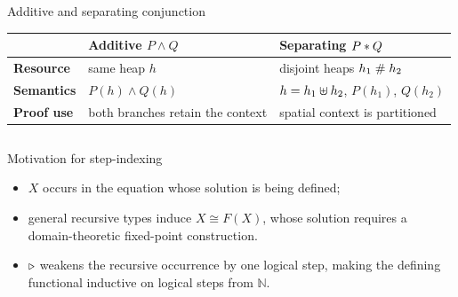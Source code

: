 \documentclass[10pt,aspectratio=169]{beamer}
\begin{document}
\begin{frame}{Additive and separating conjunction}
  \begin{table}
    \centering
    \begin{tabularx}{\textwidth}{>{\bfseries}p{} Y Y}
      \toprule
      & Additive $P\land Q$ & Separating $P\mathbin{*} Q$ \\
      \midrule
      Resource
        & same heap $h$
        & disjoint heaps $h_1\mathrel{\#} h_2$ \\
      Semantics
        & $P(h)\land Q(h)$
        & $h=h_1\mathbin{\uplus} h_2$, $P(h_1)$, $Q(h_2)$ \\
      Proof use
        & both branches retain the context
        & spatial context is partitioned \\
      \bottomrule
    \end{tabularx}
  \end{table}

  \vspace{0.35cm}
  \begin{columns}[T,onlytextwidth]
    \begin{column}{0.49\textwidth}
    \end{column}
    \begin{column}{0.49\textwidth}
    \end{column}
  \end{columns}
\end{frame}

\begin{frame}{Motivation for step-indexing}

  \begin{itemize}
    \item $X$ occurs in the equation whose solution is being defined;
    \item general recursive types induce $X\cong F(X)$, whose solution
      requires a domain-theoretic fixed-point construction.
  \end{itemize}


  \begin{itemize}
    \item \textcolor{PKURed}{$\mathord{\triangleright}$} weakens the recursive occurrence by one logical step, making the defining functional inductive on logical steps from $\mathbb N$.
  \end{itemize}
\end{frame}
\end{document}
